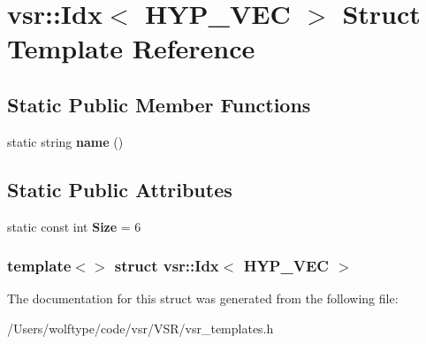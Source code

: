 \hypertarget{structvsr_1_1_idx_3_01_h_y_p___v_e_c_01_4}{\section{vsr\-:\-:Idx$<$ H\-Y\-P\-\_\-\-V\-E\-C $>$ Struct Template Reference}
\label{structvsr_1_1_idx_3_01_h_y_p___v_e_c_01_4}
}
\subsection*{Static Public Member Functions}
\begin{DoxyCompactItemize}
\item 
\hypertarget{structvsr_1_1_idx_3_01_h_y_p___v_e_c_01_4_aff99a822137d9e316327f76772874c9d}{static string {\bfseries name} ()}\label{structvsr_1_1_idx_3_01_h_y_p___v_e_c_01_4_aff99a822137d9e316327f76772874c9d}

\end{DoxyCompactItemize}
\subsection*{Static Public Attributes}
\begin{DoxyCompactItemize}
\item 
\hypertarget{structvsr_1_1_idx_3_01_h_y_p___v_e_c_01_4_a7ae0b7bd7b8944f8e4cdb2bb0077132c}{static const int {\bfseries Size} = 6}\label{structvsr_1_1_idx_3_01_h_y_p___v_e_c_01_4_a7ae0b7bd7b8944f8e4cdb2bb0077132c}

\end{DoxyCompactItemize}
\subsubsection*{template$<$$>$ struct vsr\-::\-Idx$<$ H\-Y\-P\-\_\-\-V\-E\-C $>$}



The documentation for this struct was generated from the following file\-:\begin{DoxyCompactItemize}
\item 
/\-Users/wolftype/code/vsr/\-V\-S\-R/vsr\-\_\-templates.\-h\end{DoxyCompactItemize}
